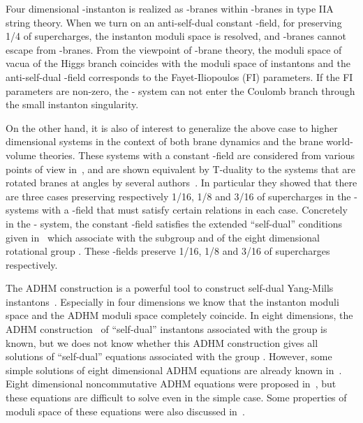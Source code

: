 \documentclass[a4paper,12pt]{article}
\begin{document}
Four dimensional \coordHE{}  \coordHE{}-instanton is realized as \coordHE{}  \coordHE{}-branes 
within \coordHE{}  \coordHE{}-branes in type IIA string theory.
When we turn on an anti-self-dual constant \coordHE{}-field, 
for preserving 1/4 of supercharges,  
the instanton moduli space is resolved, and \coordHE{}-branes 
cannot escape from \coordHE{}-branes.
From the viewpoint of \coordHE{}-brane theory, 
the moduli space of vacua of the Higgs branch coincides with the moduli space 
of instantons and the anti-self-dual \coordHE{}-field corresponds to  
the Fayet-Iliopoulos (FI) parameters.
If the FI parameters are non-zero, the \coordHE{}-\coordHE{} system can not enter the 
Coulomb branch through the small instanton singularity.

On the other hand, it is also of interest to generalize the above case 
to higher dimensional systems in the context of both brane dynamics and the 
brane world-volume theories.
These systems with a constant \coordHE{}-field are considered 
from various points of view in~\cite{cimm, park, witten, fio, ohta}, 
and are shown equivalent by T-duality to the systems 
that are rotated branes at angles by several 
authors~\cite{ohtan, ohta, pt, pt2, ggpt}.
In particular they showed that there are three cases  
preserving respectively 1/16, 1/8 and 3/16 of supercharges 
in the \coordHE{}-\coordHE{} systems with a \coordHE{}-field that must satisfy certain 
relations in each case. 
Concretely in the \coordHE{}-\coordHE{} system, the constant \coordHE{}-field satisfies the 
extended ``self-dual'' conditions given in~\cite{cdfn, ward} 
which associate with the subgroup \coordHE{} and \coordHE{} 
of the eight dimensional rotational group \coordHE{}.
These \coordHE{}-fields preserve 1/16, 1/8 and 3/16 of supercharges respectively.

The ADHM construction is a powerful tool to construct self-dual Yang-Mills 
instantons~\cite{adhm, cg}.
Especially in four dimensions we know that the instanton moduli space 
and the ADHM moduli space completely coincide. 
In eight dimensions, the ADHM construction~\cite{cgk} 
of ``self-dual'' instantons associated with the group \coordHE{} 
is known, 
but we does not know whether this ADHM construction gives all solutions 
of ``self-dual'' equations associated with the group \coordHE{} .
However, some simple solutions of eight dimensional ADHM equations are already 
known in~\cite{cgk, pt}.
Eight dimensional noncommutative ADHM equations were proposed in~\cite{ohta}, 
but these equations are difficult to solve even in the simple case. 
Some properties of moduli space of these equations 
were also discussed in~\cite{hio}.
\end{document}
